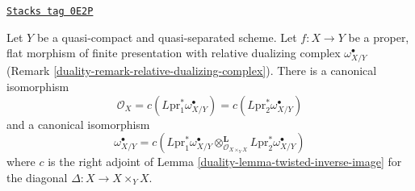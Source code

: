 \begin{lemma}[Rigidity]

\label{duality-lemma-van-den-bergh}
\href{https://stacks.math.columbia.edu/tag/0E2P}{\texttt{Stacks tag 0E2P}}

Let $Y$ be a quasi-compact and quasi-separated scheme.
Let $f : X \to Y$ be a proper, flat morphism of finite presentation
with relative dualizing complex $\omega_{X/Y}^\bullet$
(Remark \ref{duality-remark-relative-dualizing-complex}).
There is a canonical isomorphism
\begin{equation}
\label{equation-pre-rigid}
\mathcal{O}_X =
c(L\text{pr}_1^*\omega_{X/Y}^\bullet) =
c(L\text{pr}_2^*\omega_{X/Y}^\bullet)
\end{equation}
and a canonical isomorphism
\begin{equation}
\label{equation-rigid}
\omega_{X/Y}^\bullet =
c\left(L\text{pr}_1^*\omega_{X/Y}^\bullet
\otimes_{\mathcal{O}_{X \times_Y X}}^\mathbf{L}
L\text{pr}_2^*\omega_{X/Y}^\bullet\right)
\end{equation}
where $c$ is the right adjoint of
Lemma \ref{duality-lemma-twisted-inverse-image}
for the diagonal $\Delta : X \to X \times_Y X$.
\end{lemma}

